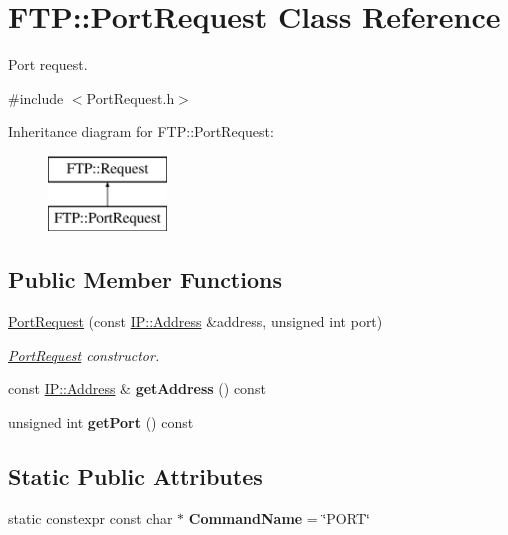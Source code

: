 \hypertarget{classFTP_1_1PortRequest}{}\section{F\+T\+P\+:\+:Port\+Request Class Reference}
\label{classFTP_1_1PortRequest}


Port request.  




{\ttfamily \#include $<$Port\+Request.\+h$>$}

Inheritance diagram for F\+T\+P\+:\+:Port\+Request\+:\begin{figure}[H]
\begin{center}
\leavevmode
\includegraphics[height=2.000000cm]{classFTP_1_1PortRequest}
\end{center}
\end{figure}
\subsection*{Public Member Functions}
\begin{DoxyCompactItemize}
\item 
\hyperlink{classFTP_1_1PortRequest_a880ff4f41e2bcec2cfac43a6c90c5511}{Port\+Request} (const \hyperlink{classFTP_1_1IP_1_1Address}{I\+P\+::\+Address} \&address, unsigned int port)
\begin{DoxyCompactList}\small\item\em \hyperlink{classFTP_1_1PortRequest}{Port\+Request} constructor. \end{DoxyCompactList}\item 
\hypertarget{classFTP_1_1PortRequest_a056cc2a789af4cf9e2b1655a607803fd}{}const \hyperlink{classFTP_1_1IP_1_1Address}{I\+P\+::\+Address} \& {\bfseries get\+Address} () const \label{classFTP_1_1PortRequest_a056cc2a789af4cf9e2b1655a607803fd}

\item 
\hypertarget{classFTP_1_1PortRequest_a24bba13c833381f9cee9977c838a7571}{}unsigned int {\bfseries get\+Port} () const \label{classFTP_1_1PortRequest_a24bba13c833381f9cee9977c838a7571}

\end{DoxyCompactItemize}
\subsection*{Static Public Attributes}
\begin{DoxyCompactItemize}
\item 
\hypertarget{classFTP_1_1PortRequest_abe4ea52bfb6cce24fb0a0de77d742804}{}static constexpr const char $\ast$ {\bfseries Command\+Name} = \char`\"{}P\+O\+R\+T\char`\"{}\label{classFTP_1_1PortRequest_abe4ea52bfb6cce24fb0a0de77d742804}

\end{DoxyCompactItemize}


